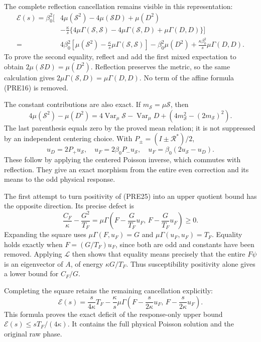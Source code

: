 \documentclass[11pt]{article}
\begin{document}
The complete reflection cancellation remains visible in this representation:
\[
 \begin{aligned}
 \mathscr E(s)=\beta_0^2[&
 4\mu(\mathcal S^2)-4\mu(\mathcal SD)+\mu(D^2)\\
 &-\frac{\kappa}{s}\{4\mu\Gamma(\mathcal S,\mathcal S)
           -4\mu\Gamma(\mathcal S,D)+\mu\Gamma(D,D)\}]\\
 ={}&4\beta_0^2\left[\mu(\mathcal S^2)
                     -\frac{\kappa}{s}\mu\Gamma(\mathcal S,\mathcal S)\right]
       -\beta_0^2\mu(D^2)+\frac{\kappa\beta_0^2}{s}\mu\Gamma(D,D).
 \end{aligned}\tag{PRE27}
\]
To prove the second equality, reflect and add the first mixed expectation to obtain \(2\mu(\mathcal SD)=\mu(D^2)\). Reflection preserves the metric, so the same calculation gives \(2\mu\Gamma(\mathcal S,D)=\mu\Gamma(D,D)\). No term of the affine formula (PRE16) is removed.

The constant contributions are also exact. If \(m_{\mathcal S}=\mu\mathcal S\), then
\[
 4\mu(\mathcal S^2)-\mu(D^2)
  =4\operatorname{Var}_\mu\mathcal S-\operatorname{Var}_\mu D
       +(4m_{\mathcal S}^2-(2m_{\mathcal S})^2).
 \tag{PRE28}
\]
The last parenthesis equals zero by the proved mean relation; it is not suppressed by an independent centering choice. With \(P_\pm=(I\pm\mathcal R^*)/2\),
\[
 u_D=2P_+u_{\mathcal S},\quad
 u_F=2\beta_0P_-u_{\mathcal S},\quad
 u_F=\beta_0(2u_{\mathcal S}-u_D).
 \tag{PRE29}
\]
These follow by applying the centered Poisson inverse, which commutes with reflection. They give an exact morphism from the entire even correction and its means to the odd physical response.

The first attempt to turn positivity of (PRE25) into an upper quotient bound has the opposite direction. Its precise defect is
\[
 \frac{C_F}{\kappa}-\frac{G^2}{T_F}
  =\mu\Gamma\left(F-\frac{G}{T_F}u_F,\,
                       F-\frac{G}{T_F}u_F\right)\ge0.
 \tag{PRE30}
\]
Expanding the square uses \(\mu\Gamma(F,u_F)=G\) and
\(\mu\Gamma(u_F,u_F)=T_F\). Equality holds exactly when
\(F=(G/T_F)u_F\), since both are odd and constants have been removed.
Applying \(\mathcal L\) then shows that equality means precisely that the entire \(F\psi\) is an eigenvector of \(A\), of energy \(\kappa G/T_F\). Thus susceptibility positivity alone gives a lower bound for \(C_F/G\).

Completing the square retains the remaining cancellation explicitly:
\[
 \mathscr E(s)
 =\frac{s}{4\kappa}T_F-\frac{\kappa}{s}
       \mu\Gamma\left(F-\frac{s}{2\kappa}u_F,\,
                         F-\frac{s}{2\kappa}u_F\right).
 \tag{PRE31}
\]
This formula proves the exact deficit of the response-only upper bound
\(\mathscr E(s)\le sT_F/(4\kappa)\). It contains the full physical Poisson solution and the original raw phase.
\end{document}
